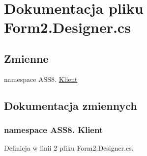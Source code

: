 \hypertarget{a00044}{
\section{Dokumentacja pliku Form2.Designer.cs}
\label{d5/df9/a00044}
}
\subsection*{Zmienne}
\begin{CompactItemize}
\item 
﻿namespace ASS8. \hyperlink{a00044_50d8d80fabd02a9a24fb725624e1ad24}{Klient}
\end{CompactItemize}


\subsection{Dokumentacja zmiennych}
\hypertarget{a00044_50d8d80fabd02a9a24fb725624e1ad24}{
\subsubsection[{Klient}]{\setlength{\rightskip}{0pt plus 5cm}﻿namespace ASS8. Klient}}
\label{d5/df9/a00044_50d8d80fabd02a9a24fb725624e1ad24}




Definicja w linii 2 pliku Form2.Designer.cs.